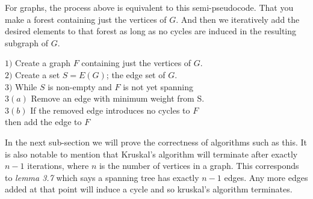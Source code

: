\documentclass[../main.tex]{subfiles}
\begin{document}
For graphs, the process above is equivalent to this semi-pseudocode. That you make a forest containing just the vertices of $G.$ And then we iteratively add the desired elements to that forest as long as no cycles are induced in the resulting subgraph of $G.$
\begin{algorithm}
$1)$ Create a graph $F$ containing just the vertices of $G.$\\
$2)$ Create a set $S = E(G)$; the edge set of $G.$ \\
$3)$ While $S$ is non-empty and $F$ is not yet spanning\\
\hspace{5mm} $3(a)$ Remove an edge with minimum weight from S.\\
\hspace{5mm} $3(b)$ If the removed edge introduces no cycles to $F$\\
\hspace{5mm} then add the edge to $F$\\
\end{algorithm}

In the next sub-section we will prove the correctness of algorithms such as this. It is also notable to mention that Kruskal's algorithm will terminate after exactly $n-1$ iterations, where $n$ is the number of vertices in a graph. This corresponds to \textit{lemma 3.7} which says a spanning tree has exactly $n-1$ edges. Any more edges added at that point will induce a cycle and so kruskal's algorithm terminates.
\end{document}
